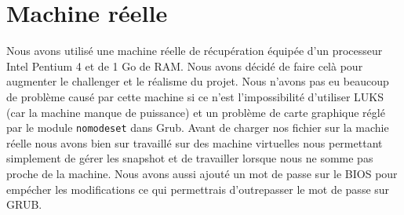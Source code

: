\section{Machine réelle}
Nous avons utilisé une machine réelle de récupération équipée d'un processeur Intel Pentium 4 et de 1 Go de RAM. Nous avons décidé de faire celà pour augmenter le challenger et le réalisme du projet. Nous n'avons pas eu beaucoup de problème causé par cette machine si ce n'est l'impossibilité d'utiliser LUKS (car la machine manque de puissance) et un problème de carte graphique réglé par le module \texttt{nomodeset} dans Grub.
Avant de charger nos fichier sur la machie réelle nous avons bien sur travaillé sur des machine virtuelles nous permettant simplement de gérer les snapshot et de travailler lorsque nous ne somme pas proche de la machine.
Nous avons aussi ajouté un mot de passe sur le BIOS pour empécher les modifications ce qui permettrais d'outrepasser le mot de passe sur GRUB.
